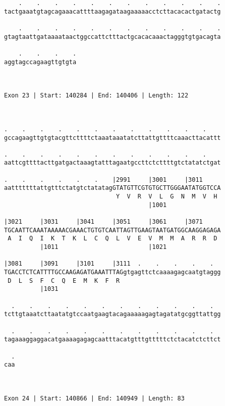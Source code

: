 \documentclass{article}
\begin{document}
\begin{Verbatim}
    .    .    .    .    .    .    .    .    .    .    .    .
tactgaaatgtagcagaaacattttaagagataagaaaaacctcttacacactgatactg
                                                            
    .    .    .    .    .    .    .    .    .    .    .    .
gtagtaattgataaaataactggccattctttactgcacacaaactagggtgtgacagta
                                                            
    .    .    .    .
aggtagccagaagttgtgta
                    
                    
 
Exon 23 | Start: 140284 | End: 140406 | Length: 122



.    .    .    .    .    .    .    .    .    .    .    .    
gccagaagttgtgtacgttcttttctaaataaatatcttattgttttcaaacttacattt
                                                            
.    .    .    .    .    .    .    .    .    .    .    .    
aattcgttttacttgatgactaaagtatttagaatgccttctcttttgtctatatctgat
                                                            
.    .    .    .    .    .    |2991     |3001     |3011     
aatttttttattgtttctatgtctatatagGTATGTTCGTGTGCTTGGGAATATGGTCCA
                               Y  V  R  V  L  G  N  M  V  H 
                                        |1001               
  
|3021     |3031     |3041     |3051     |3061     |3071     
TGCAATTCAAATAAAAACGAAACTGTGTCAATTAGTTGAAGTAATGATGGCAAGGAGAGA
 A  I  Q  I  K  T  K  L  C  Q  L  V  E  V  M  M  A  R  R  D 
          |1011                         |1021               
  
|3081     |3091     |3101     |3111  .    .    .    .    .  
TGACCTCTCATTTTGCCAAGAGATGAAATTTAGgtgagttctcaaaagagcaatgtaggg
 D  L  S  F  C  Q  E  M  K  F  R                            
          |1031                                             
  
  .    .    .    .    .    .    .    .    .    .    .    .  
tcttgtaaatcttaatatgtccaatgaagtacagaaaaagagtagatatgcggttattgg
                                                            
  .    .    .    .    .    .    .    .    .    .    .    .  
tagaaaggaggacatgaaaagagagcaatttacatgtttgtttttctctacatctcttct
                                                            
  .
caa
   
   
 
Exon 24 | Start: 140866 | End: 140949 | Length: 83




\end{Verbatim}
\end{document}
